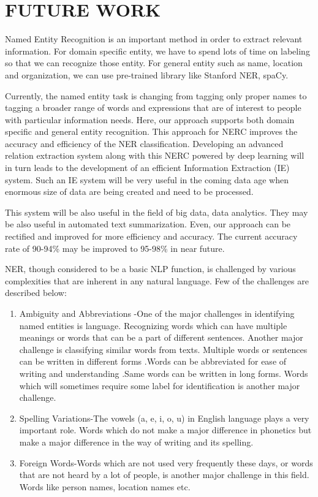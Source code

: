 \documentclass[12pt,a4paper,final]{extreport}
\begin{document}
\newpage
\chapter{FUTURE WORK}
Named Entity Recognition is an important method in order to extract relevant information. For domain specific entity, we have to spend lots of time on labeling so that we can recognize those entity. For general entity such as name, location and organization, we can use pre-trained library like Stanford NER, spaCy.

\vspace{0.5cm}
Currently, the named entity task is changing from tagging only proper names to tagging a broader range of words and expressions that are of interest to people with particular information needs. Here, our approach supports both domain specific and general entity recognition. This approach for NERC improves the accuracy and efficiency of the NER classification. Developing an advanced relation extraction system along with this NERC powered by deep learning will in turn leads to the development of an efficient Information Extraction (IE) system. Such an IE system will be very useful in the coming data age when enormous size of data are being created and need to be processed.

\vspace{0.5cm}
This system will be also useful in the field of big data, data analytics. They may be also useful in automated text summarization. Even, our approach can be rectified and improved for more efficiency and accuracy. The current accuracy rate of 90-94\% may be improved to 95-98\% in near future. 

\vspace{0.5cm}
NER, though considered to be a basic NLP function, is challenged by various complexities that are inherent in any natural language. Few of the challenges are described below:
\begin{enumerate}
	\item Ambiguity and Abbreviations -One of the major challenges in identifying named entities is language. Recognizing words which can have multiple meanings or words that can be a part of different sentences. Another major challenge is classifying similar words from texts. Multiple words or sentences can be written in different forms .Words can be abbreviated for ease of writing and understanding .Same words can be written in long forms. Words which will sometimes require some label for identification is another major challenge.
	\item Spelling Variations-The vowels (a, e, i, o, u) in English language plays a very important role. Words which do not make a major difference in phonetics but make a major difference in the way of writing and its spelling.
	\item Foreign Words-Words which are not used very frequently these days, or words that are not heard by a lot of people, is another major challenge in this field. Words like person names, location names etc.
\end{enumerate}
\end{document}
